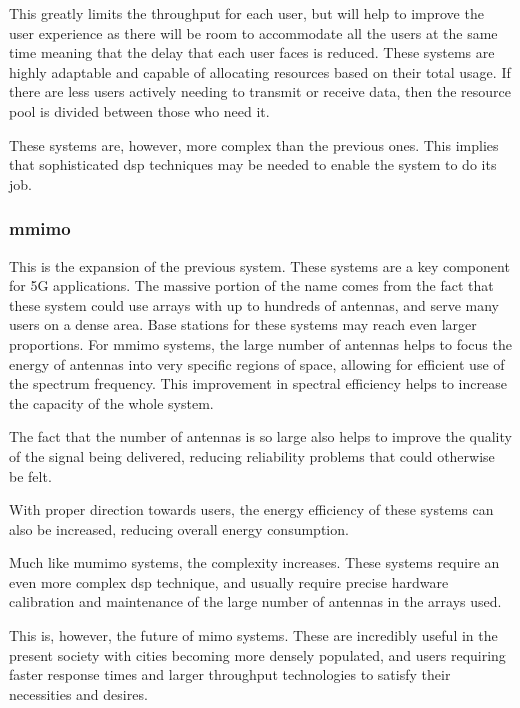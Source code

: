 \par This greatly limits the throughput for each user, but will help to improve the user experience as there will be room to accommodate all the users at the same time meaning that the delay that each user faces is reduced. These systems are highly adaptable and capable of allocating resources based on their total usage. If there are less users actively needing to transmit or receive data, then the resource pool is divided between those who need it.

\par These systems are, however, more complex than the previous ones. This implies that sophisticated \ac{dsp} techniques may be needed to enable the system to do its job.

\subsubsection{\acl{mmimo}}
\par This is the expansion of the previous system. These systems are a key component for 5G applications. The massive portion of the name comes from the fact that these system could use arrays with up to hundreds of antennas, and serve many users on a dense area. Base stations for these systems may reach even larger proportions. For \acl{mmimo} systems, the large number of antennas helps to focus the energy of antennas into very specific regions of space, allowing for efficient use of the spectrum frequency. This improvement in spectral efficiency helps to increase the capacity of the whole system.

\par The fact that the number of antennas is so large also helps to improve the quality of the signal being delivered, reducing reliability problems that could otherwise be felt.

\par With proper direction towards users, the energy efficiency of these systems can also be increased, reducing overall energy consumption.

\par Much like \ac{mumimo} systems, the complexity increases. These systems require an even more complex \ac{dsp} technique, and usually require precise hardware calibration and maintenance of the large number of antennas in the arrays used.

\par This is, however, the future of \ac{mimo} systems. These are incredibly useful in the present society with cities becoming more densely populated, and users requiring faster response times and larger throughput technologies to satisfy their necessities and desires. 

